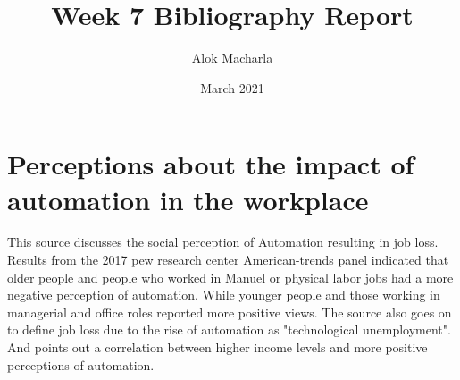 \documentclass{article}
\title{Week 7 Bibliography Report}
\author{Alok Macharla}
\date{March 2021}
\begin{document}
\maketitle

\section{Perceptions about the impact of automation in the workplace}
This source discusses the social perception of Automation resulting in job loss. Results from the 2017 pew research center American-trends panel indicated that older people and people who worked in Manuel or physical labor jobs had a more negative perception of automation.
While younger people and those working in managerial and office roles reported more positive views. The source also goes on to define job loss due to the rise of automation as "technological unemployment".
And points out a correlation between higher income levels and more positive perceptions of automation. \cite{14373956020200501}



\end{document}
